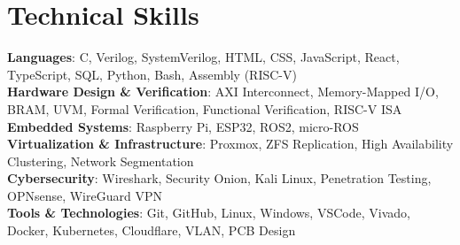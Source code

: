 \section{Technical Skills}
 \begin{itemize}[leftmargin=0.15in, label={}]
    \small{\item{
     \textbf{Languages}{: C, Verilog, SystemVerilog, HTML, CSS, JavaScript, React, TypeScript,  SQL, Python, Bash, Assembly (RISC-V)} \\
     \textbf{Hardware Design \& Verification}{: AXI Interconnect, Memory-Mapped I/O, BRAM, UVM, Formal Verification, Functional Verification, RISC-V ISA} \\
     \textbf{Embedded Systems}{: Raspberry Pi, ESP32, ROS2, micro-ROS} \\
     \textbf{Virtualization \& Infrastructure}{: Proxmox, ZFS Replication, High Availability Clustering, Network Segmentation} \\
     \textbf{Cybersecurity}{: Wireshark, Security Onion, Kali Linux, Penetration Testing, OPNsense, WireGuard VPN} \\
     \textbf{Tools \& Technologies}{: Git, GitHub, Linux, Windows, VSCode, Vivado, Docker, Kubernetes, Cloudflare, VLAN, PCB Design} \\
    }}
 \end{itemize}